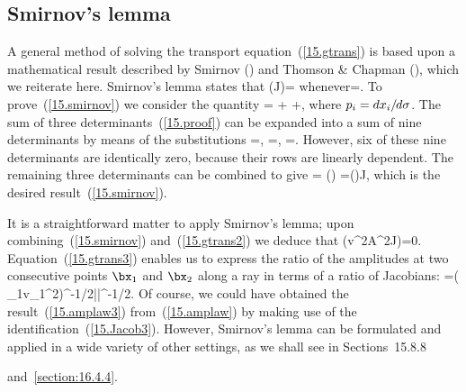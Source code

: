 {\renewcommand{\thesubsection}{$\!\!\!\raise1.3ex\hbox{$\star$}\!\!$
\arabic{chapter}.\arabic{section}.\arabic{subsection}}
\subsection{Smirnov's lemma}
%
\renewcommand{\thesubsection}{\arabic{chapter}.\arabic{section}.\arabic{subsection}}

A general method of solving the transport equation~(\ref{15.gtrans}) is based
upon a mathematical result described by Smirnov (\citeyear{smirnov64}) and
Thomson \& Chapman (\citeyear{thomson&chapman85}), which we reiterate here.
Smirnov's lemma states that
\eq \label{15.smirnov}
(\ln J)=\bdel\cdot\bp\quad
\mbox{whenever}\quad {}=\bp.
\en
To prove~(\ref{15.smirnov}) we consider the quantity
\eq \label{15.proof}
=
+
+,
\en
where $p_i=dx_i/\hspace{-0.3 mm}d\sigma$.
The sum of three determinants~(\ref{15.proof})
can be expanded into a sum of nine determinants
by means of the substitutions
\eq
{}
=,\qquad
{}
=,\qquad
{}
=.
\en
However, six of these nine determinants are
identically zero, because their rows are linearly
dependent.  The remaining three determinants can be combined to give
\eq \label{15.proof2}
=
\bigg(\bigg)
=(\bdel\cdot\bp)\hspace{0.3 mm}J,
\en
which is the desired result~(\ref{15.smirnov}).

It is a straightforward matter to apply Smirnov's lemma;
upon combining~(\ref{15.smirnov}) and~(\ref{15.gtrans2})
we deduce that
\eq \label{15.gtrans3}
\ln(\rho v^2A^2J)=0.
\en
Equation~(\ref{15.gtrans3}) enables us to express
the ratio of the amplitudes at two consecutive
points $\bx_1$ and $\bx_2$ along a ray in terms
of a ratio of Jacobians:
\eq \label{15.amplaw3}
=\left(
{\rho_1v_1^2}\right)^{-1/2}\left|\right|^{-1/2}.
\en
Of course, we could have obtained the result~(\ref{15.amplaw3})
from~(\ref{15.amplaw}) by making use of the identification~(\ref{15.Jacob3}).
However, Smirnov's lemma can be formulated and applied in a wide variety
of other settings, as we shall see
in Sections~15.8.8} and~\ref{section:16.4.4}.
%

